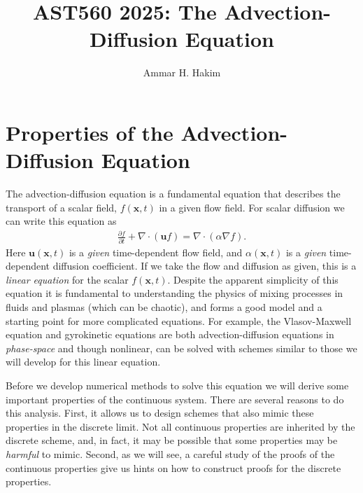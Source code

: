 \documentclass[12pt]{article}
\title{AST560 2025: The Advection-Diffusion Equation}%
\author{Ammar H. Hakim}%
\date{}
\theoremstyle{definition}
\theoremstyle{definition}
\theoremstyle{definition}
\newcommand{\pfrac}[2]{\frac{\partial #1}{\partial #2}}
\newcommand{\mvec}[1]{\mathbf{#1}}
\newcommand{\gcn}{\nabla}
\begin{document}
\maketitle

\tableofcontents

\section{Properties of the Advection-Diffusion Equation}

The advection-diffusion equation is a fundamental equation that
describes the transport of a scalar field, $f(\mvec{x},t)$ in a given
flow field. For scalar diffusion we can write this equation as
\begin{align}
  \pfrac{f}{t}
  +
  \gcn\cdot(\mvec{u} f)
  =
  \gcn\cdot(\alpha \gcn f).
  \label{eq:adv-diff}
\end{align}
Here $\mvec{u}(\mvec{x},t)$ is a \emph{given} time-dependent flow
field, and $\alpha(\mvec{x},t)$ is a \emph{given} time-dependent
diffusion coefficient. If we take the flow and diffusion as given,
this is a \emph{linear equation} for the scalar
$f(\mvec{x},t)$. Despite the apparent simplicity of this equation it
is fundamental to understanding the physics of mixing processes in
fluids and plasmas (which can be chaotic), and forms a good model and
a starting point for more complicated equations. For example, the
Vlasov-Maxwell equation and gyrokinetic equations are both
advection-diffusion equations in \emph{phase-space} and though
nonlinear, can be solved with schemes similar to those we will develop
for this linear equation.

Before we develop numerical methods to solve this equation we will
derive some important properties of the continuous system. There are
several reasons to do this analysis. First, it allows us to design
schemes that also mimic these properties in the discrete limit. Not
all continuous properties are inherited by the discrete scheme, and,
in fact, it may be possible that some properties may be \emph{harmful}
to mimic. Second, as we will see, a careful study of the proofs of the
continuous properties give us hints on how to construct proofs for the
discrete properties.
\end{document}

